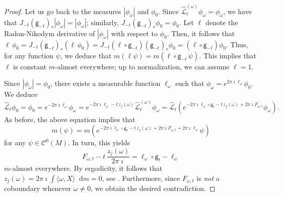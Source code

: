 \documentclass[11pt,letterpaper]{amsart}
\newcommand \cL {{\mathcal L}}
\newcommand{\geo}{\mathsf{g}}
\newcommand*{\diff}{\mathop{}\!\mathrm{d}}
\theoremstyle{definition}
\begin{document}
\begin{proof}
Let us go back to the measures $|\phi_{\omega}|$ and $\phi_0$. Since $ {\hat \cL^{(\omega)}_t} \phi_{\omega} = \phi_{\omega}$, we have that $J_{-t} (\geo_{-t})_{\ast}|\phi_{\omega}| = |\phi_{\omega}|$; similarly,  $J_{-t} (\geo_{-t})_{\ast} \phi_0 = \phi_0$. Let $\ell$ denote the Radon-Nikodym derivative of $|\phi_{\omega}|$ with respect to $\phi_0$. Then, it follows that $\ell \, \phi_0 = J_{-t} (\geo_{-t})_{\ast} (\ell \, \phi_0) = J_{-t} ( \ell\circ \geo_{-t}) (\geo_{-t})_{\ast}  \phi_0 =  ( \ell\circ \geo_{-t})  \phi_0 $. Thus, for any function $\psi$, we deduce that $m( \ell \psi )= m( \ell\circ \geo_{-t} \, \psi)$. This implies that $\ell$ is constant $m$-almost everywhere; up to normalization, we can assume $\ell = 1$. 

Since $|\phi_{\omega}| = \phi_0$, there exists a measurable function $\ell_{\omega}$ such that $\phi_{\omega} = e^{2\pi\imath \ell_\omega} \phi_0$.
We deduce
	\[
		{\hat \cL_t}\phi_0 = \phi_0 =e^{-2\pi\imath \ell_\omega} \phi_{\omega} =e^{-2\pi\imath\ell_\omega-t \, z_j(\omega)}  \hat \cL^{(\omega)}_t \phi_{\omega} = \hat \cL_t( e^{-2\pi\imath\ell_\omega\circ \geo_t-t \, z_j(\omega) + 2\pi\imath F_{\omega,t}} \phi_{\omega}).
	\]
As before, the above equation implies that 
\[
m(\psi) = m ( e^{-2\pi\imath\ell_\omega\circ \geo_t-t \, z_j(\omega) + 2\pi\imath F_{\omega,t} + 2\pi\imath\ell_\omega} \psi)
\]
for any $\psi \in \mathscr{C}^0(M)$. In turn, this yields
	\[
F_{\omega,t}-t \, \frac{z_j(\omega)}{2\pi \imath} =\ell_\omega\circ \geo_t-\ell_\omega
	\]
	$m$-almost everywhere. By ergodicity, it follows that $z_j(\omega)=2\pi \imath \int  \langle \omega, X \rangle \diff m = 0$, see  \cite{KatSun}.
	Furthermore, since $F_{\omega,t}$ is \emph{not} a coboundary whenever $\omega \neq 0$, we obtain the desired contradiction.
	
	
	
	
\end{proof}
\end{document}
